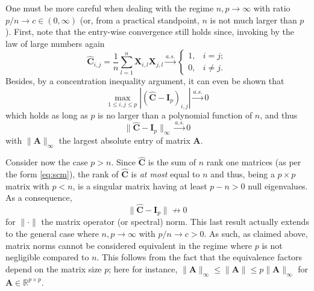 \documentclass[MAL,biber]{nowfnt} %
\newcommand{\asto}{{ \xrightarrow{a.s.} }}
\newcommand{\A}{{\mathbf{A}}}
\newcommand{\C}{{\mathbf{C}}}
\newcommand{\I}{{\mathbf{I}}}
\newcommand{\X}{{\mathbf{X}}}
\newcommand{\RR}{{\mathbb{R}}}
\begin{document}
\medskip

One must be more careful when dealing with the regime $n,p \to \infty$ with ratio $p/n \to c \in (0, \infty)$ (or, from a practical standpoint, $n$ is not much larger than $p$). First, note that the entry-wise convergence still holds since, invoking by the law of large numbers again
\begin{equation*}
    \hat \C_{i,j} = \frac1n\sum_{l=1}^n \X_{i,l}\X_{j,l} \asto \begin{cases} 1, & i=j; \\ 0, &i \neq j. \end{cases}
\end{equation*}
Besides, by a concentration inequality argument, it can even be shown that
\begin{equation*}
    \max_{1\leq i,j\leq p} \left| (\hat \C - \I_p)_{i,j} \right| \asto 0
\end{equation*}
which holds as long as $p$ is no larger than a polynomial function of $n$, and thus
\begin{equation*}
    \|\hat \C-\I_p\|_\infty \asto 0
\end{equation*}
with $\|\A\|_\infty$ the largest absolute entry of matrix $\A$.

Consider now the case $p > n$. Since $\hat \C$ is the sum of $n$ rank one matrices (as per the form \eqref{eq:scm}), the rank of $\hat\C$ is \emph{at most} equal to $n$ and thus, being a $p\times p$ matrix with $p<n$, is a singular matrix having at least $p - n>0$ null eigenvalues. As a consequence, 
\begin{equation*}
    \| \hat \C - \I_p \| \not\to 0
\end{equation*}
for $\|\cdot\|$ the matrix operator (or spectral) norm. This last result actually extends to the general case where $n,p\to\infty$ with $p/n\to c>0$. As such, as claimed above, matrix norms cannot be considered equivalent in the regime where $p$ is not negligible compared to $n$. This follows from the fact that the equivalence factors depend on the matrix size $p$; here for instance, $\|\A\|_\infty\leq \|\A\|\leq p\|\A\|_\infty$ for $\A \in \RR^{p \times p}$.
\end{document}
